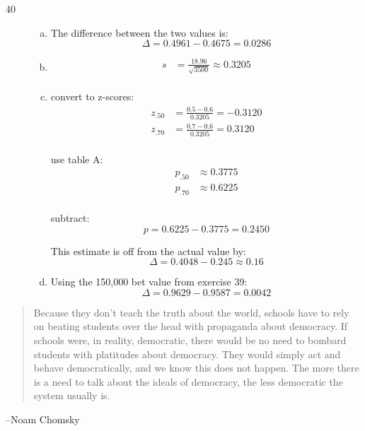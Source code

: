 \documentclass[letterpaper, landscape]{exam}
\begin{document}
\begin{description}
      \newpage

      \item[40]
        \begin{enumerate}[(a)]
          \item The difference between the two values is:
            \[
              \Delta = 0.4961 - 0.4675 = \boxed{ 0.0286 }
            \]

          \item
            \begin{align*}
              s &= \frac{18.96}{\sqrt{3500}} \approx \boxed{ 0.3205 } \\
            \end{align*}
            
          \item
            convert to z-scores:
            \begin{align*}
              z_{.50} &= \frac{0.5 - 0.6}{0.3205} = -0.3120 \\
              z_{.70} &= \frac{0.7 - 0.6}{0.3205} = 0.3120 \\
            \end{align*}

            use table A:
            \begin{align*}
              p_{.50} & \approx 0.3775 \\
              p_{.70} & \approx 0.6225 \\
            \end{align*}

            subtract:
            \[
              p = 0.6225 - 0.3775 = 0.2450
            \]

            This estimate is off from the actual value by:
            \[
              \Delta = 0.4048 - 0.245 \approx \boxed{ 0.16 }
            \]
            
          \item Using the 150,000 bet value from exercise 39:
            \[
              \Delta = 0.9629 - 0.9587 = \boxed{ 0.0042 }
            \]

        \end{enumerate}
  \end{description}

  \else
    \vspace{10 cm}
    \begin{quote}
      \begin{em}
        Because they don't teach the truth about the world, schools have to rely on
        beating students over the head with propaganda about democracy. If schools were,
        in reality, democratic, there would be no need to bombard students with
        platitudes about democracy. They would simply act and behave democratically, and
        we know this does not happen. The more there is a need to talk about the ideals
        of democracy, the less democratic the system usually is.
      \end{em}
    \end{quote}
    \hspace{1 cm} --Noam Chomsky
  \fi
\end{document}
